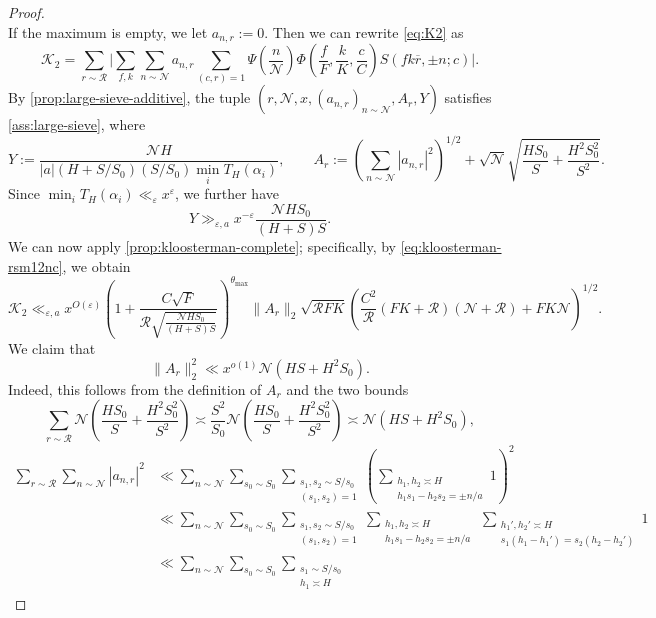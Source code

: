 \documentclass[reqno,11pt]{amsart}
\theoremstyle{remark}
\numberwithin{equation}{section}
\newcommand{\NN}{\mathcal{N}}
\newcommand{\RR}{\mathcal{R}}
\newcommand{\mK}{\mathcal{K}}
\newcommand{\eps}{\varepsilon}
\renewcommand{\bar}{\overline}
\begin{document}
\begin{proof}
\[\]
If the maximum is empty, we let $a_{n, r} := 0$. Then we can rewrite \cref{eq:K2} as
\[
    \mK_2 = \sum_{r \sim \RR}
    \Bigg\vert
    \sum_{f,k} 
    \sum_{n \sim \NN}
    a_{n,r}
    \sum_{(c, r) = 1}
    \Psi\left(\frac{n}{\NN}\right) \Phi\left(\frac{f}{F}, \frac{k}{K}, \frac{c}{C} \right)
    S(fk\bar{r}, \pm n; c)
    \Bigg\vert.
\]
By \cref{prop:large-sieve-additive}, the tuple $(r, \NN, x, (a_{n,r})_{n \sim \NN}, A_r, Y)$ satisfies \cref{ass:large-sieve}, where 
\[
    Y := \frac{\NN H}{|a|(H+S/S_0)(S/S_0) \min_i T_H(\alpha_i)},
    \qquad
    A_r := \left(\sum_{n \sim \NN} |a_{n,r}|^2\right)^{1/2} + \sqrt{\NN} \sqrt{\frac{H S_0}{S} + \frac{H^2 S_0^2}{S^2}}.
\]
Since $\min_i T_H(\alpha_i) \ll_\eps x^\eps$,
we further have
\[
    Y \gg_{\eps,a} x^{-\eps}\frac{\NN H S_0}{(H+S)S}.
\]
We can now apply \cref{prop:kloosterman-complete}; specifically, by \cref{eq:kloosterman-rsm12nc}, we obtain
\[
    \mK_2 \ll_{\eps,a} x^{O(\eps)}
    \left(1 + \frac{C\sqrt{F}}{\RR\sqrt{\frac{\NN H S_0}{(H+S)S}}}\right)^{\theta_{\max}} 
    \|A_r\|_2 \sqrt{\RR F K}
    \left(\frac{C^2}{\RR}(FK + \RR)(\NN + \RR) + FK\NN\right)^{1/2}.
\]
We claim that
\begin{equation} \label{eq:primes-l2-bound}
    \|A_r\|_2^2 \ll x^{o(1)} \NN(HS + H^2 S_0).
\end{equation}
Indeed, this follows from the definition of $A_r$ and the two bounds
\[
    \sum_{r \sim \RR} \NN \left(\frac{HS_0}{S} + \frac{H^2 S_0^2}{S^2}\right)
    \asymp 
    \frac{S^2}{S_0} \NN \left(\frac{HS_0}{S} + \frac{H^2 S_0^2}{S^2}\right)
    \asymp 
    \NN (HS + H^2 S_0),
\]
\[
\begin{aligned}
    \sum_{r \sim \RR} \sum_{n \sim \NN} |a_{n,r}|^2 
    &\ll
    \sum_{n \sim \NN}
    \sum_{s_0 \sim S_0} \sum_{\substack{s_1, s_2 \sim S/s_0 \\ (s_1, s_2) = 1}}
    \left( \sum_{\substack{h_1, h_2 \asymp H \\ h_1 s_1 - h_2 s_2 = \pm n/a}} 1 \right)^2
    \\
    &\ll 
    \sum_{n \sim \NN}
    \sum_{s_0 \sim S_0} 
    \sum_{\substack{s_1, s_2 \sim S/s_0 \\ (s_1, s_2) = 1}}
    \sum_{\substack{h_1, h_2 \asymp H \\ h_1 s_1 - h_2 s_2 = \pm n/a}}\, \sum_{\substack{h_1', h_2' \asymp H \\ s_1(h_1 - h_1') = s_2(h_2 - h_2')}} 1
    \\
    &\ll 
    \sum_{n \sim \NN}
    \sum_{s_0 \sim S_0} 
    \sum_{\substack{s_1 \sim S/s_0 \\ h_1 \asymp H}}

\end{aligned}\]
\end{proof}
\end{document}
